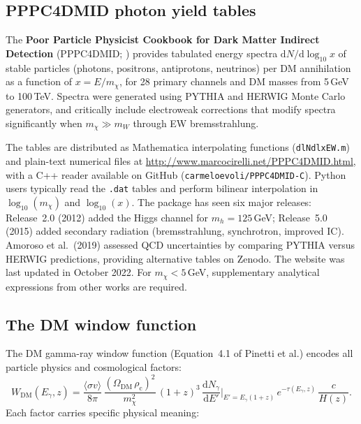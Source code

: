 \documentclass[10pt,a4paper]{article}
\newcommand{\sigv}{\langle\sigma v\rangle}
\newcommand{\mchi}{m_\chi}
\newcommand{\rhoc}{\rho_{\mathrm{c}}}
\newcommand{\OmDM}{\Omega_{\mathrm{DM}}}
\begin{document}
\subsection{PPPC4DMID photon yield tables}

The \textbf{Poor Particle Physicist Cookbook for Dark Matter Indirect Detection} (PPPC4DMID; \citealt{Cirelli2011}) provides tabulated energy spectra $\mathrm{d}N/\mathrm{d}\log_{10}x$ of stable particles (photons, positrons, antiprotons, neutrinos) per DM annihilation as a function of $x = E/\mchi$, for 28 primary channels and DM masses from 5\,GeV to 100\,TeV. Spectra were generated using PYTHIA and HERWIG Monte Carlo generators, and critically include electroweak corrections \citep{Ciafaloni2011} that modify spectra significantly when $\mchi \gg m_W$ through EW bremsstrahlung.

The tables are distributed as Mathematica interpolating functions (\texttt{dlNdlxEW.m}) and plain-text numerical files at \url{http://www.marcocirelli.net/PPPC4DMID.html}, with a C++ reader available on GitHub (\texttt{carmeloevoli/PPPC4DMID-C}). Python users typically read the \texttt{.dat} tables and perform bilinear interpolation in $\log_{10}(\mchi)$ and $\log_{10}(x)$. The package has seen six major releases: Release~2.0 (2012) added the Higgs channel for $m_h = 125$\,GeV; Release~5.0 (2015) added secondary radiation (bremsstrahlung, synchrotron, improved IC). Amoroso et al.\ (2019) assessed QCD uncertainties by comparing PYTHIA versus HERWIG predictions, providing alternative tables on Zenodo. The website was last updated in October 2022. For $\mchi < 5$\,GeV, supplementary analytical expressions from other works are required.

\subsection{The DM window function}

The DM gamma-ray window function (Equation~4.1 of Pinetti et al.) encodes all particle physics and cosmological factors:
\begin{equation}
\label{eq:WDM}
    W_{\mathrm{DM}}(E_\gamma, z) = \frac{\sigv}{8\pi}\,\frac{(\OmDM\,\rhoc)^2}{\mchi^2}\,(1+z)^3\,\frac{\mathrm{d}N_\gamma}{\mathrm{d}E'}\bigg|_{E' = E_\gamma(1+z)}\,e^{-\tau(E_\gamma,z)}\,\frac{c}{H(z)}.
\end{equation}
Each factor carries specific physical meaning:
\end{document}
